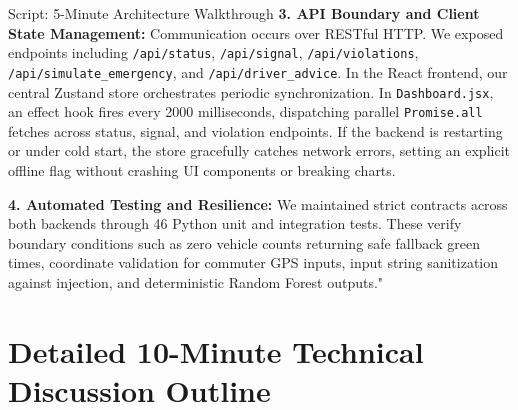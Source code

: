 \documentclass[11pt,a4paper,oneside]{report}
\begin{document}
\begin{interviewq}{Script: 5-Minute Architecture Walkthrough}
\textbf{3. API Boundary and Client State Management:}
Communication occurs over RESTful HTTP. We exposed endpoints including \texttt{/api/status}, \texttt{/api/signal}, \texttt{/api/violations}, \texttt{/api/simulate\_emergency}, and \texttt{/api/driver\_advice}. In the React frontend, our central Zustand store orchestrates periodic synchronization. In \texttt{Dashboard.jsx}, an effect hook fires every 2000 milliseconds, dispatching parallel \texttt{Promise.all} fetches across status, signal, and violation endpoints. If the backend is restarting or under cold start, the store gracefully catches network errors, setting an explicit offline flag without crashing UI components or breaking charts.

\textbf{4. Automated Testing and Resilience:}
We maintained strict contracts across both backends through 46 Python unit and integration tests. These verify boundary conditions such as zero vehicle counts returning safe fallback green times, coordinate validation for commuter GPS inputs, input string sanitization against injection, and deterministic Random Forest outputs."
\end{interviewq}

\section{Detailed 10-Minute Technical Discussion Outline}
\label{sec:script_10min}
\end{document}
